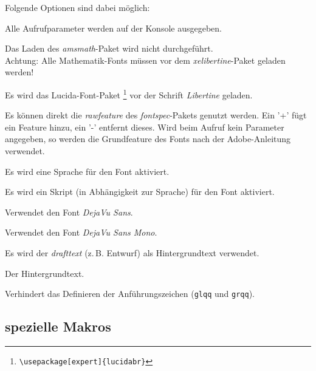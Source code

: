 \documentclass{fontdoku}
\begin{document}
Folgende Optionen sind dabei möglich:
\begin{description}
\item [debug] Alle Aufrufparameter werden auf der Konsole ausgegeben.
\item [noamsmath] Das Laden des \emph{amsmath}-Paket wird nicht durchgeführt.\\
      Achtung: Alle Mathematik-Fonts müssen vor dem \emph{xelibertine}-Paket
      geladen werden!
\item [lucida] Es wird das Lucida-Font-Paket%
      \footnote{\texttt{\textbackslash usepackage[expert]\{lucidabr\}}}
      vor der Schrift \emph{Libertine} geladen.
\item [rawfeature] Es können direkt die \emph{rawfeature} des \emph{fontspec}-Pakets genutzt werden.
      Ein '+' fügt ein Feature hinzu, ein '-' entfernt dieses. Wird beim Aufruf kein Parameter angegeben, so werden die Grundfeature des Fonts nach der Adobe-Anleitung verwendet.
\item [language] Es wird eine Sprache für den Font aktiviert.
\item [script]   Es wird ein Skript (in Abhängigkeit zur Sprache) für den Font aktiviert.
\item [dejavusans] Verwendet den Font \emph{DejaVu Sans}.
\item [dejavusansmono] Verwendet den Font \emph{DejaVu Sans Mono}.
\item [draft] Es wird der \emph{drafttext} (z.\,B. Entwurf) als Hintergrundtext verwendet.
\item [drafttext] Der Hintergrundtext.
\item [noquotes] Verhindert das Definieren der Anführungszeichen (\texttt{glqq} und \texttt{grqq}).
\end{description}

\newpage
\subsection{spezielle Makros}
\end{document}

